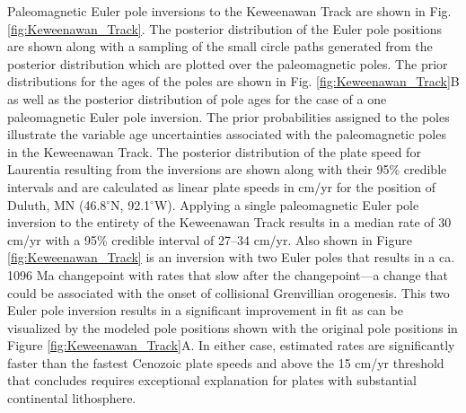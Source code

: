 \documentclass[11pt,letterpaper]{article}
\begin{document}
Paleomagnetic Euler pole inversions to the Keweenawan Track are shown in Fig. \ref{fig:Keweenawan_Track}. The posterior distribution of the Euler pole positions are shown along with a sampling of the small circle paths generated from the posterior distribution which are plotted over the paleomagnetic poles. The prior distributions for the ages of the poles are shown in Fig. \ref{fig:Keweenawan_Track}B as well as the posterior distribution of pole ages for the case of a one paleomagnetic Euler pole inversion. The prior probabilities assigned to the poles illustrate the variable age uncertainties associated with the paleomagnetic poles in the Keweenawan Track. The posterior distribution of the plate speed for Laurentia resulting from the inversions are shown along with their 95$\%$ credible intervals and are calculated as linear plate speeds in cm/yr for the position of Duluth, MN (46.8$^\circ$N, 92.1$^\circ$W). Applying a single paleomagnetic Euler pole inversion to the entirety of the Keweenawan Track results in a median rate of 30 cm/yr with a 95$\%$ credible interval of 27–34 cm/yr. Also shown in Figure \ref{fig:Keweenawan_Track} is an inversion with two Euler poles that results in a ca. 1096 Ma changepoint with rates that slow after the changepoint---a change that could be associated with the onset of collisional Grenvillian orogenesis. This two Euler pole inversion results in a significant improvement in fit as can be visualized by the modeled pole positions shown with the original pole positions in Figure \ref{fig:Keweenawan_Track}A. In either case, estimated rates are significantly faster than the fastest Cenozoic plate speeds and above the 15 cm/yr threshold that \cite{Zahirovic2015a} concludes requires exceptional explanation for plates with substantial continental lithosphere.
\end{document}
